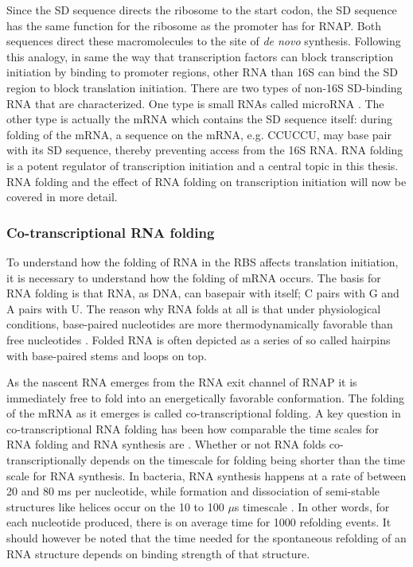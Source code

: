 Since the SD sequence directs the ribosome to the start codon, the SD sequence
has the same function for the ribosome as the promoter has for RNAP. Both
sequences direct these macromolecules to the site of \textit{de novo}
synthesis. Following this analogy, in same the way that transcription factors
can block transcription initiation by binding to promoter regions, other RNA
than 16S can bind the SD region to block translation initiation. There are two
types of non-16S SD-binding RNA that are characterized. One type is small RNAs
called microRNA \cite{storz_controlling_2004}. The other type is actually the
mRNA which contains the SD sequence itself: during folding of the mRNA, a
sequence on the mRNA, e.g. CCUCCU, may base pair with its SD sequence, thereby
preventing access from the 16S RNA. RNA folding is a potent regulator of
transcription initiation \cite{hall_role_1982, de_smit_secondary_1990} and a
central topic in this thesis. RNA folding and the effect of RNA folding on
transcription initiation will now be covered in more detail.

\subsubsection{Co-transcriptional RNA folding}
To understand how the folding of RNA in the RBS affects translation initiation,
it is necessary to understand how the folding of mRNA occurs. The basis for RNA
folding is that RNA, as DNA, can basepair with itself; C pairs with G and A
pairs with U. The reason why RNA folds at all is that under physiological
conditions, base-paired nucleotides are more thermodynamically favorable than
free nucleotides \cite{onoa_rna_2004}. Folded RNA is often depicted as a series
of so called hairpins with base-paired stems and loops on top.

As the nascent RNA emerges from the RNA exit channel of RNAP it is immediately
free to fold into an energetically favorable conformation. The folding of the
mRNA as it emerges is called co-transcriptional folding. A key question in
co-transcriptional RNA folding has been how comparable the time scales for RNA
folding and RNA synthesis are \cite{de_smit_translational_2003-1}. Whether or
not RNA folds co-transcriptionally depends on the timescale for folding being
shorter than the time scale for RNA synthesis. In bacteria, RNA synthesis
happens at a rate of between 20 and 80 ms per nucleotide, while formation and
dissociation of semi-stable structures like helices occur on the 10 to 100
$\mu$s timescale \cite{isambert_jerky_2009}. In other words, for each
nucleotide produced, there is on average time for 1000 refolding events. It
should however be noted that the time needed for the spontaneous refolding of
an RNA structure depends on binding strength of that structure.

